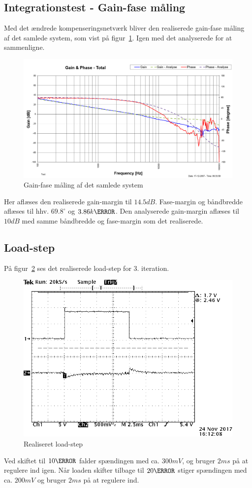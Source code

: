 \subsection{Integrationstest - Gain-fase måling}
Med det ændrede kompenseringsnetværk bliver den realiserede gain-fase måling af det samlede system, som vist på figur~\ref{fig:Realisering_total_3}. Igen med det analyserede for at sammenligne.
\begin{figure}[H]
	\center
	\includegraphics[max width=0.7\linewidth]{../dokumentation/tex/3iteration/billeder/Realisering/Realisering_gain_fase_total.PNG}
	\caption{Gain-fase måling af det samlede system}
	\label{fig:Realisering_total_3}
\end{figure}
\noindent Her aflæses den realiserede gain-margin til $14.5dB$. Fase-margin og båndbredde aflæses til hhv. $69.8^\circ$ og $3.86k\hertz$. Den analyserede gain-margin aflæses til $10dB$ med samme båndbredde og fase-margin som det realiserede.

\subsection{Load-step}
På figur~\ref{fig:Loadstep3} ses det realiserede load-step for 3. iteration.
\begin{figure}[H]
	\center
	\includegraphics[max width=0.7\linewidth]{../dokumentation/tex/3iteration/billeder/realisering/Loadstep.PNG}
	\caption{Realiseret load-step}
	\label{fig:Loadstep3}
\end{figure} 
\noindent Ved skiftet til $10\ohm$ falder spændingen med ca. $300mV$, og bruger $2ms$ på at regulere ind igen. Når loaden skifter tilbage til $20\ohm$ stiger spændingen med ca. $200mV$ og bruger $2ms$ på at regulere ind. 